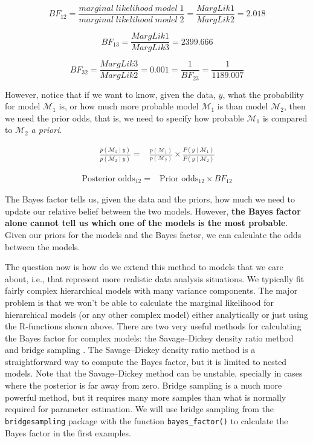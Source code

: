 \documentclass[12pt,]{krantz}
\theoremstyle{definition}
\theoremstyle{definition}
\theoremstyle{definition}
\theoremstyle{remark}
\begin{document}
\begin{equation}
BF_{12} = \frac{marginal \; likelihood \; model \; 1}{marginal \; likelihood \; model \; 2} = \frac{MargLik1}{MargLik2} = 2.018 
\end{equation}

\begin{equation}
BF_{13} = \frac{MargLik1}{MargLik3}=  2399.666 
\end{equation}

\begin{equation}
BF_{32} = \frac{MargLik3}{MargLik2} =  0.001 = \frac{1}{BF_{23}} =  \frac{1}{1189.007 }
\end{equation}

However, notice that if we want to know, given the data, \(y\), what the probability for model \(\mathcal{M}_1\) is, or how much more probable model \(\mathcal{M}_1\) is than model \(\mathcal{M}_2\), then we need the prior odds, that is, we need to specify how probable \(\mathcal{M}_1\) is compared to \(\mathcal{M}_2\) \emph{a priori}.

\begin{align}
\frac{p(\mathcal{M}_1 \mid y)}{p(\mathcal{M}_2 \mid y)} =& \frac{p(\mathcal{M}_1)}{p(\mathcal{M}_2)} \times \frac{P(y \mid \mathcal{M}_1)}{P(y \mid \mathcal{M}_2)}
\end{align}

\begin{align}
\text{Posterior odds}_{12} = & \text{Prior odds}_{12} \times BF_{12}
\end{align}

The Bayes factor tells us, given the data and the priors, how much we need to update our relative belief between the two models. However, \textbf{the Bayes factor alone cannot tell us which one of the models is the most probable}. Given our priors for the models and the Bayes factor, we can calculate the odds between the models.

The question now is how do we extend this method to models that we care about, i.e., that represent more realistic data analysis situations. We typically fit fairly complex hierarchical models with many variance components. The major problem is that we won't be able to calculate the marginal likelihood for hierarchical models (or any other complex model) either analytically or just using the R-functions shown above. There are two very useful methods for calculating the Bayes factor for complex models: the Savage--Dickey density ratio method \citep{DickeyLientz1970, wagenmakers2010BayesianHypothesisTesting} and bridge sampling \citep{bennettEfficientEstimationFree1976, mengSimulatingRatiosNormalizing1996}. The Savage--Dickey density ratio method is a straightforward way to compute the Bayes factor, but it is limited to nested models.
Note that the Savage--Dickey method can be unstable, specially in cases where the posterior is far away from zero. Bridge sampling is a much more powerful method, but it requires many more samples than what is normally required for parameter estimation. We will use bridge sampling from the \texttt{bridgesampling} \citep[\citet{gronauBridgesamplingPackageEstimating2017}]{gronauTutorialBridgeSampling2017} package with the function \texttt{bayes\_factor()} to calculate the Bayes factor in the first examples.
\end{document}
